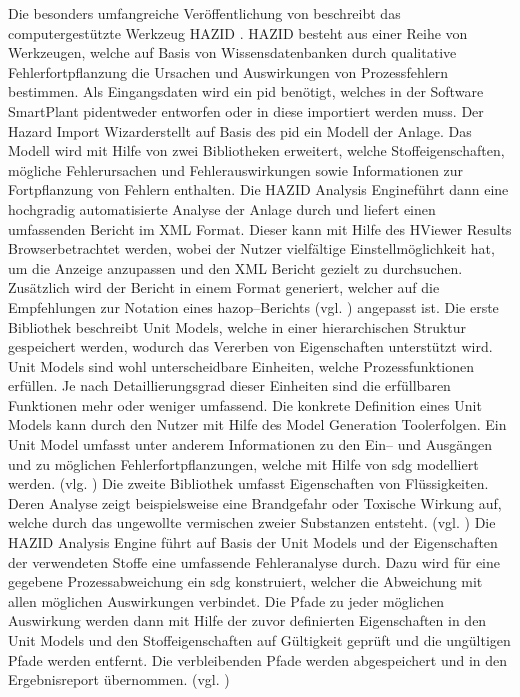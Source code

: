 Die besonders umfangreiche Ver\"offentlichung von \citeauthor{McCoy_1999} beschreibt das computergest\"utzte Werkzeug HAZID \cite{McCoy_1999, McCoy_1999a, McCoy_1999b, McCoy_2000, McCoy_2000a}. HAZID besteht aus einer Reihe von Werkzeugen, welche auf Basis von Wissensdatenbanken durch qualitative Fehlerfortpflanzung die Ursachen und Auswirkungen von Prozessfehlern bestimmen. Als Eingangsdaten wird ein \ac{pid} ben\"otigt, welches in der Software \glqq SmartPlant \ac{pid}\grqq { }entweder entworfen oder in diese importiert werden muss. Der \glqq Hazard Import Wizard\grqq { }erstellt auf Basis des \ac{pid} ein Modell der Anlage. Das Modell wird mit Hilfe von zwei Bibliotheken erweitert, welche Stoffeigenschaften, m\"ogliche Fehlerursachen und Fehlerauswirkungen sowie Informationen zur Fortpflanzung von Fehlern enthalten. Die \glqq HAZID Analysis Engine\grqq { }f\"uhrt dann eine hochgradig automatisierte Analyse der Anlage durch und liefert einen umfassenden Bericht im XML Format. Dieser kann mit Hilfe des \glqq HViewer Results Browser\grqq { }betrachtet werden, wobei der Nutzer vielf\"altige Einstellm\"oglichkeit hat, um die Anzeige anzupassen und den XML Bericht gezielt zu durchsuchen. Zus\"atzlich wird der Bericht in einem Format generiert, welcher auf die Empfehlungen zur Notation eines \ac{hazop}--Berichts {(vgl. \cite{Crawley_2015})} angepasst ist. \newline
Die erste Bibliothek beschreibt \glqq Unit Models\grqq { }, welche in einer hierarchischen Struktur gespeichert werden, wodurch das Vererben von Eigenschaften unterst\"utzt wird. Unit Models sind wohl unterscheidbare Einheiten, welche Prozessfunktionen erf\"ullen. Je nach Detaillierungsgrad dieser Einheiten sind die erf\"ullbaren Funktionen mehr oder weniger umfassend. Die konkrete Definition eines Unit Models kann durch den Nutzer mit Hilfe des \glqq Model Generation Tool\grqq { }erfolgen. Ein Unit Model umfasst unter anderem Informationen zu den {Ein-- und Aus}g\"angen und zu m\"oglichen Fehlerfortpflanzungen, welche mit Hilfe von \ac{sdg} modelliert werden. {(vlg. \cite{McCoy_1999a})} \newline
Die zweite Bibliothek umfasst Eigenschaften von Fl\"ussigkeiten. Deren Analyse zeigt beispielsweise eine Brandgefahr oder Toxische Wirkung auf, welche durch das ungewollte vermischen zweier Substanzen entsteht. {(vgl. \cite{McCoy_1999b})} \newline
Die HAZID Analysis Engine f\"uhrt auf Basis der Unit Models und der Eigenschaften der verwendeten Stoffe eine umfassende Fehleranalyse durch. Dazu wird f\"ur eine gegebene Prozessabweichung ein \ac{sdg} konstruiert, welcher die Abweichung mit allen m\"oglichen Auswirkungen verbindet. Die Pfade zu jeder m\"oglichen Auswirkung werden dann mit Hilfe der zuvor definierten Eigenschaften in den Unit Models und den Stoffeigenschaften auf G\"ultigkeit gepr\"uft und die ung\"ultigen Pfade werden entfernt. Die verbleibenden Pfade werden abgespeichert und in den Ergebnisreport \"ubernommen. {(vgl. \cite{McCoy_1999b, McCoy_2000a})}\newline
